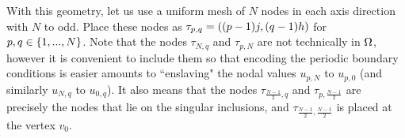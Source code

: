 With this geometry, let us use a uniform mesh of $N$ nodes in each axis direction with $N$ to odd.
Place these nodes as $\tau_{p,q} = \left( (p-1)j, (q-1)h \right)$ for $p,q\in\left\{ 1,...,N \right\}$.
Note that the nodes $\tau_{N,q}$ and $\tau_{p,N}$ are not technically in $\Omega$, however it is convenient to include them so that encoding the periodic boundary conditions is easier amounts to ``enslaving" the nodal values $u_{p,N}$ to $u_{p,0}$ (and similarly $u_{N,q}$ to $u_{0,q}$).
It also means that the nodes $\tau_{\frac{N-1}{2},q}$ and $\tau_{p,\frac{N-1}{2}}$ are precisely the nodes that lie on the singular inclusions, and $\tau_{\frac{N-1}{2},\frac{N-1}{2}}$ is placed at the vertex $v_0$.
